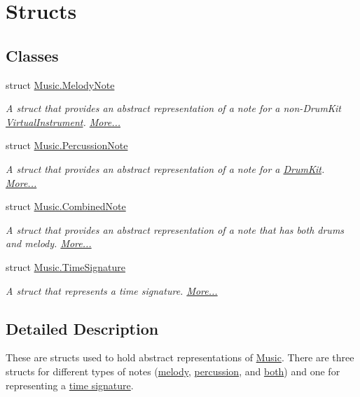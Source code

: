 \hypertarget{group___music_structs}{}\section{Structs}
\label{group___music_structs}
\subsection*{Classes}
\begin{DoxyCompactItemize}
\item 
struct \hyperlink{group___music_structs_struct_music_1_1_melody_note}{Music.\+Melody\+Note}
\begin{DoxyCompactList}\small\item\em A struct that provides an abstract representation of a note for a non-\/\+Drum\+Kit \hyperlink{class_virtual_instrument}{Virtual\+Instrument}.  \hyperlink{group___music_structs_struct_music_1_1_melody_note}{More...}\end{DoxyCompactList}\item 
struct \hyperlink{group___music_structs_struct_music_1_1_percussion_note}{Music.\+Percussion\+Note}
\begin{DoxyCompactList}\small\item\em A struct that provides an abstract representation of a note for a \hyperlink{class_drum_kit}{Drum\+Kit}.  \hyperlink{group___music_structs_struct_music_1_1_percussion_note}{More...}\end{DoxyCompactList}\item 
struct \hyperlink{group___music_structs_struct_music_1_1_combined_note}{Music.\+Combined\+Note}
\begin{DoxyCompactList}\small\item\em A struct that provides an abstract representation of a note that has both drums and melody.  \hyperlink{group___music_structs_struct_music_1_1_combined_note}{More...}\end{DoxyCompactList}\item 
struct \hyperlink{group___music_structs_struct_music_1_1_time_signature}{Music.\+Time\+Signature}
\begin{DoxyCompactList}\small\item\em A struct that represents a time signature.  \hyperlink{group___music_structs_struct_music_1_1_time_signature}{More...}\end{DoxyCompactList}\end{DoxyCompactItemize}


\subsection{Detailed Description}
These are structs used to hold abstract representations of \hyperlink{class_music}{Music}. There are three structs for different types of notes (\hyperlink{group___music_structs_struct_music_1_1_melody_note}{melody}, \hyperlink{group___music_structs_struct_music_1_1_percussion_note}{percussion}, and \hyperlink{group___music_structs_struct_music_1_1_combined_note}{both}) and one for representing a \hyperlink{group___music_structs_struct_music_1_1_time_signature}{time signature}. 

